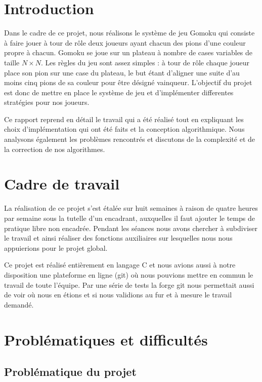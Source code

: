 \documentclass[12pt]{article}
\begin{document}
\tableofcontents
\newpage

\section*{Introduction}
Dans le cadre de ce projet, nous réalisons le système de jeu Gomoku qui consiste à faire jouer à tour de rôle deux joueurs ayant chacun des pions d'une couleur propre à chacun. Gomoku se joue sur un plateau à nombre de cases variables de taille $N\times N$. Les règles du jeu sont assez simples : à tour de rôle chaque joueur place son pion sur une case du plateau, le but étant d'aligner une suite d'au moins cinq pions de sa couleur pour être désigné vainqueur. L'objectif du projet est donc de mettre en place le système de jeu et d'implémenter differentes stratégies pour nos joueurs.

Ce rapport reprend en détail le travail qui a été réalisé tout en expliquant les choix d'implémentation qui ont été faits et la conception algorithmique. Nous analysons également les problèmes rencontrés et discutons de la complexité et de la correction de nos algorithmes.

\section*{Cadre de travail}
La réalisation de ce projet s'est étalée sur huit semaines à raison de quatre heures par semaine sous la tutelle d'un encadrant, auxquelles il faut ajouter le temps de pratique libre non encadrée. Pendant les séances nous avons chercher à subdiviser le travail et ainsi réaliser des fonctions auxiliaires sur lesquelles nous nous appuierions pour le projet global.

Ce projet est réalisé entièrement en langage C et nous avions aussi à notre disposition une plateforme en ligne (git) où nous pouvions mettre en commun le travail de toute l'équipe. Par une série de tests la forge git nous permettait aussi de voir où nous en étions et si nous validions au fur et à mesure le travail demandé.
\newpage

\section{Problématiques et difficultés}
\subsection{Problématique du projet}
\end{document}
